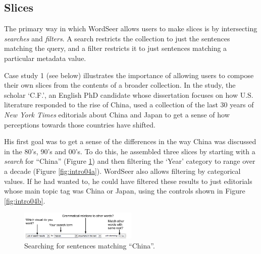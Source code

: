 \documentclass{sig-alternate}
\begin{document}
\begin{enumerate}
\subsection{Slices}

The primary way in which WordSeer allows users to make slices is by intersecting \emph{searches} and \emph{filters}.  A search restricts the collection to just the sentences matching the query, and a filter restricts it to just sentences matching a particular metadata value. 

Case study 1 (see below) illustrates the importance of allowing users to compose their own slices from the contents of a  broader collection. In the study, the scholar `C.F.', an English PhD candidate whose dissertation focuses on how U.S. literature responded to the rise of China, used a collection of  the last 30 years of \emph{New York Times} editorials about China and Japan to get a sense of how perceptions towards those countries have shifted.

His first goal was to get a sense of the differences in the way China was discussed in the 80's, 90's and 00's. To do this, he assembled three slices by starting with a \emph{search} for ``China'' (Figure \ref{fig:intro03})  and then filtering the `Year' category to range over a decade (Figure \ref{fig:intro04a}).  WordSeer also allows filtering by categorical values. If he had wanted to, he could have filtered these results to just editorials whose main topic tag was China or Japan, using the controls shown in Figure \ref{fig:intro04b}. 
\begin{figure}[ht!]
\begin{center}
	\includegraphics[width=0.5\textwidth]{fig/intro/03b.png}
\end{center}
    \caption{%
        Searching for sentences matching ``China''.\label{fig:intro03}
     }%
\end{figure}


\end{enumerate}
\end{document}
